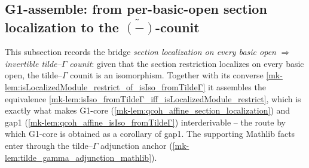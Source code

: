 \subsection{G1-assemble: from per-basic-open section localization to the
\texorpdfstring{$\widetilde{(-)}$}{tilde}-counit}

This subsection records the bridge \emph{section localization on every basic open}
\(\Rightarrow\) \emph{invertible tilde--\(\Gamma\) counit}: given that the section
restriction localizes on every basic open, the tilde--\(\Gamma\) counit is an
isomorphism. Together with its converse
\ref{mk-lem:isLocalizedModule_restrict_of_isIso_fromTildeΓ} it assembles the equivalence
\ref{mk-lem:isIso_fromTildeΓ_iff_isLocalizedModule_restrict}, which is exactly what makes G1-core
(\ref{mk-lem:qcoh_affine_section_localization}) and gap1
(\ref{mk-lem:qcoh_affine_isIso_fromTildeΓ}) interderivable -- the route by which G1-core is obtained as
a corollary of gap1. The supporting Mathlib facts enter through the tilde--\(\Gamma\)
adjunction anchor (\ref{mk-lem:tilde_gamma_adjunction_mathlib}).

